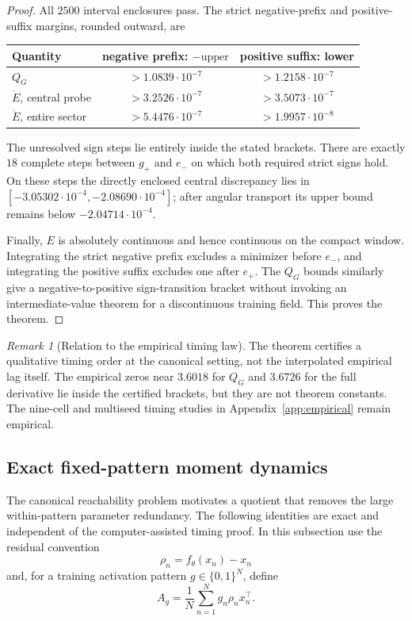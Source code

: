 \documentclass[10pt]{article}
\theoremstyle{remark}\newtheorem{remark}[theorem]{Remark}
\begin{document}
\begin{proof}
All $2500$ interval enclosures pass. The strict negative-prefix and
positive-suffix margins, rounded outward, are
\begin{center}
\begin{tabular}{lcc}
\toprule
Quantity & negative prefix: $-\text{upper}$ & positive suffix: lower\\
\midrule
$Q_G$ & $>1.0839\cdot10^{-7}$ & $>1.2158\cdot10^{-7}$\\
$\dot E$, central probe & $>3.2526\cdot10^{-7}$ & $>3.5073\cdot10^{-7}$\\
$\dot E$, entire sector & $>5.4476\cdot10^{-7}$ & $>1.9957\cdot10^{-8}$\\
\bottomrule
\end{tabular}
\end{center}
The unresolved sign steps lie entirely inside the stated brackets. There are
exactly $18$ complete steps between $g_+$ and $e_-$ on which both required
strict signs hold. On these steps the directly enclosed central discrepancy
lies in
$[-3.05302\cdot10^{-4},-2.08690\cdot10^{-4}]$; after angular transport its
upper bound remains below $-2.04714\cdot10^{-4}$.

Finally, $E$ is absolutely continuous and hence continuous on the compact
window. Integrating the strict negative prefix excludes a minimizer before
$e_-$, and integrating the positive suffix excludes one after $e_+$. The
$Q_G$ bounds similarly give a negative-to-positive sign-transition bracket
without invoking an intermediate-value theorem for a discontinuous training
field. This proves the theorem.
\end{proof}

\begin{remark}[Relation to the empirical timing law]
The theorem certifies a qualitative timing order at the canonical setting,
not the interpolated empirical lag itself. The empirical zeros near
$3.6018$ for $Q_G$ and $3.6726$ for the full derivative lie inside the
certified brackets, but they are not theorem constants. The nine-cell and
multiseed timing studies in Appendix~\ref{app:empirical} remain empirical.
\end{remark}

\subsection{Exact fixed-pattern moment dynamics}
\label{app:pattern-quotient}

The canonical reachability problem motivates a quotient that removes the
large within-pattern parameter redundancy. The following identities are exact
and independent of the computer-assisted timing proof. In this subsection use
the residual convention
\[
 \rho_n=f_\theta(x_n)-x_n
\]
and, for a training activation pattern $g\in\{0,1\}^N$, define
\[
 A_g=\frac1N\sum_{n=1}^N g_n\rho_nx_n^\top.
\]
\end{document}
